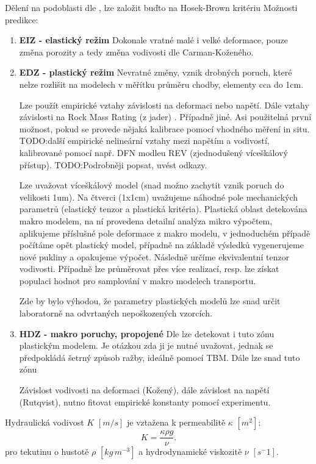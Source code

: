 \documentclass{article}
\def\todo#1{{TODO:\color{violet}#1}}
\begin{document}
Dělení na podoblasti dle \cite{Perras2016}, lze založit buďto na 
Hosek-Brown kritériu \cite{}
\cite{Hajiabdolmajid2002}
Možnosti predikce:
\begin{enumerate}
    \item {\bf EIZ - elastický režim} Dokonale vratné malé i velké deformace, pouze změna porozity a tedy změna vodivosti dle Carman-Koženého.
    \item {\bf EDZ - plastický režim} Nevratné změny, vznik drobných poruch, které nelze rozlišit na modelech v měřítku průměru chodby, elementy cca do 1cm. 
    
    Lze použít empirické vztahy \cite{Rutqvist2009} závislosti na deformaci nebo napětí. Dále vztahy závislosti na Rock Mass Rating (z jader) \cite{Liu1999}. Případně jiné. 
    Asi použitelná první možnost, pokud se provede nějaká kalibrace pomocí vhodného měření in situ. \todo{další empirické nelineární vztahy mezi napětím a vodivostí, kalibrované pomocí 
    např. DFN modleu REV (zjednodušený víceškálový přístup).}
    \todo{Podrobněji popsat, uvést odkazy.}
    
    
    Lze uvažovat víceškálový model (snad možno zachytit vznik poruch do velikosti 1um). Na čtverci (1x1cm) uvažujeme náhodné pole mechanických parametrů (elastický tenzor a plastická kritéria). Plastická oblast detekována makro modelem, na ní provedena detailní analýza mikro výpočtem, aplikujeme příslušné pole deformace z makro modelu, v jednoduchém případě počítáme opět plastický model, případně na základě výsledků vygenerujeme nové pukliny a opakujeme výpočet. Následně určíme ekvivalentní tenzor vodivosti. Případně lze průměrovat přes více realizací, resp. lze získat populaci hodnot pro samplování v makro modelech transportu. 
    
    Zde by bylo výhodou, že parametry plastických modelů lze snad určit laboratorně na odvrtaných nepoškozených vzorcích.
    
    \item {\bf HDZ - makro poruchy, propojené} 
    Dle \cite{Perras2016} lze detekovat i tuto zónu plastickým modelem. Je otázkou zda ji je nutné uvažovat, jednak se předpokládá šetrný způsob ražby, ideálně pomocí TBM. Dále lze snad tuto zónu   
    
    Závislost vodivosti na deformaci (Kožený), dále závislost na napětí (Rutqvist), nutno fitovat empirické konstanty pomocí experimentu. 
\end{enumerate}


Hydraulická vodivost $K$ $[m/s]$ je vztažena k permeabilitě $\kappa$ $[m^2]$:
\[
    K =\frac{\kappa \rho g}{\nu}.
\]
pro tekutinu o hustotě $\rho$ $[kg\, m^{-3}]$ a hydrodynamické viskozitě $\nu$ $[s^-1]$.
\end{document}
